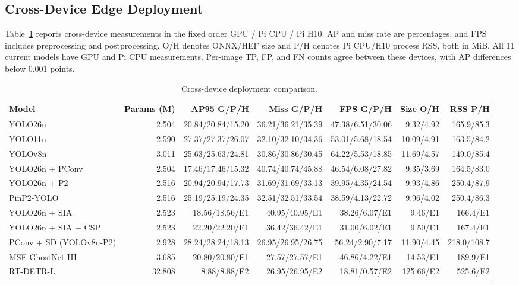 \documentclass[lettersize,journal]{IEEEtran}
\begin{document}
\subsection{Cross-Device Edge Deployment}
Table~\ref{tab:edge} reports cross-device measurements in the fixed order GPU / Pi CPU / Pi H10. AP and miss rate are percentages, and FPS includes preprocessing and postprocessing. O/H denotes ONNX/HEF size and P/H denotes Pi CPU/H10 process RSS, both in MiB. All 11 current models have GPU and Pi CPU measurements. Per-image TP, FP, and FN counts agree between these devices, with AP differences below 0.001 points.
\begin{table}[!t]
\caption{Cross-device deployment comparison.}
\label{tab:edge}
\centering\footnotesize
\setlength{\tabcolsep}{2.5pt}
\begin{tabular}{lrrrrrr}
\hline
Model & Params (M) & AP95 G/P/H & Miss G/P/H & FPS G/P/H & Size O/H & RSS P/H\\
\hline
YOLO26n & 2.504 & 20.84/20.84/15.20 & 36.21/36.21/35.39 & 47.38/6.51/30.06 & 9.32/4.92 & 165.9/85.3\\
YOLO11n & 2.590 & 27.37/27.37/26.07 & 32.10/32.10/34.36 & 53.01/5.68/18.54 & 10.09/4.91 & 163.5/84.2\\
YOLOv8n & 3.011 & 25.63/25.63/24.81 & 30.86/30.86/30.45 & 64.22/5.53/18.85 & 11.69/4.57 & 149.0/85.4\\
YOLO26n + PConv & 2.504 & 17.46/17.46/15.32 & 40.74/40.74/45.88 & 46.54/6.08/27.82 & 9.35/3.69 & 164.5/83.0\\
YOLO26n + P2 & 2.516 & 20.94/20.94/17.73 & 31.69/31.69/33.13 & 39.95/4.35/24.54 & 9.93/4.86 & 250.4/87.9\\
PinP2-YOLO & 2.516 & 25.19/25.19/24.35 & 32.51/32.51/33.54 & 38.59/4.13/22.72 & 9.96/4.02 & 250.4/86.3\\
YOLO26n + SIA & 2.523 & 18.56/18.56/E1 & 40.95/40.95/E1 & 38.26/6.07/E1 & 9.46/E1 & 166.4/E1\\
YOLO26n + SIA + CSP & 2.523 & 22.20/22.20/E1 & 36.42/36.42/E1 & 31.00/6.02/E1 & 9.50/E1 & 167.4/E1\\
PConv + SD (YOLOv8n-P2) & 2.928 & 28.24/28.24/18.13 & 26.95/26.95/26.75 & 56.24/2.90/7.17 & 11.90/4.45 & 218.0/108.7\\
MSF-GhostNet-III & 3.685 & 20.80/20.80/E1 & 27.57/27.57/E1 & 46.86/4.22/E1 & 14.53/E1 & 189.9/E1\\
RT-DETR-L & 32.808 & 8.88/8.88/E2 & 26.95/26.95/E2 & 18.81/0.57/E2 & 125.66/E2 & 525.6/E2\\
\hline
\end{tabular}
\end{table}
\end{document}
